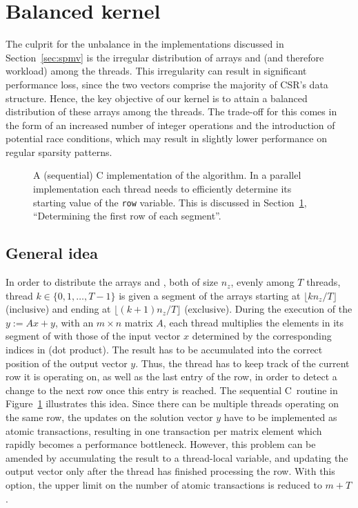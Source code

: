 \section{Balanced \spmv kernel}
\label{sec:kernel}

The culprit for the unbalance in the \spmv implementations
discussed in Section~\ref{sec:spmv}
is the irregular distribution of arrays \val and \colidx
(and therefore workload) among the threads.
This irregularity can result in significant performance loss,
since the two vectors comprise the majority of CSR's data structure.
Hence, the key objective of our kernel is to attain a balanced distribution of
these arrays among the threads.
The trade-off for this comes in the form of an increased number
of integer operations and the introduction of potential race conditions,
which may result in slightly lower performance on regular sparsity patterns.

\begin{figure}[t]
\begin{minipage}{\columnwidth}

\end{minipage}
\vspace*{-2ex}
    \caption{A (sequential) C implementation of the \bcsr algorithm.
        In a parallel implementation each thread needs to
        efficiently determine its starting value of the \texttt{row} variable.
        This is discussed in Section~\ref{sec:kernel}, ``Determining the first
        row of each segment''.}
\label{fig:spmvi}
\end{figure}

\subsection{General idea}

In order to distribute the arrays \val and \colidx, both of size $n_z$,
evenly among $T$ threads,
thread $k \in \lbrace 0,1, \ldots, T-1 \rbrace$ is given
a segment of the arrays starting at $\lfloor kn_z / T\rfloor$ (inclusive)
and ending at $\lfloor (k+1)n_z/T\rfloor$ (exclusive).
During the execution of the \spmv $y:=Ax + y$, with an $m \times n$ matrix $A$,
each thread multiplies 
the elements in its segment of \val with those of the input vector $x$
determined by the corresponding indices in \colidx (dot product).
The result has to be accumulated into the correct position
of the output vector $y$.
Thus, the thread has to keep track of the current row it is operating on,
as well as the last entry of the row,
in order to detect a change to the next row once this entry is reached.
The sequential C~routine in Figure~\ref{fig:spmvi} illustrates this idea.
Since there can be multiple threads operating on the same row,
the updates on the solution vector $y$ have to be implemented
as atomic transactions,
resulting in one transaction per matrix element
which rapidly becomes a performance bottleneck.
However, this problem can be amended
by accumulating the result to a thread-local variable,
and updating the output vector only
after the thread has finished processing the row.
With this option, the upper limit on the number of atomic transactions
is reduced to $m + T$.

